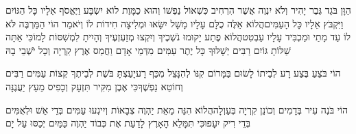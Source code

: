 \documentclass[../main/main.tex]{subfiles}
\begin{document}
\begin{multicols}{\ncols}
הַוָּן\SubEnd{} בֹּגֵד גֶּבֶר יָהִיר וְלֹא יִנְוֶה אֲשֶׁר הִרְחִיב כִּשְׁאוֹל נַפְשׁוֹ וְהוּא כַמָּוֶת לוֹא\SubEnd{} יִשְׂבָּע וַיֶּאֱסֹף אֵלָיו כָּל הַגּוֹיִם וַיִּקְבֹּץ אֵלָיו כָּל הָעַמִּים\PreVerseSpace{}הֲלוֹא אֵלֶּה כֻלָּם עָלָיו מָשָׁל יִשָּׂאוּ וּמְלִיצָה חִידוֹת לוֹ וְיֹאמַר הוֹי הַמַּרְבֶּה לֹּא לוֹ עַד מָתַי וּמַכְבִּיד עָלָיו עַבְטִט\PreVerseSpace{}הֲלוֹא פֶתַע יָקוּמוּ נֹשְׁכֶיךָ וְיִקְצוּ מְזַעְזְעֶיךָ וְהָיִיתָ לִמְשִׁסּוֹת לָמוֹ\PreVerseSpace{}כִּי אַתָּה שַׁלּוֹתָ גּוֹיִם רַבִּים יְשָׁלּוּךָ כָּל יֶתֶר עַמִּים מִדְּמֵי אָדָם וַחֲמַס אֶרֶץ קִרְיָה וְכָל יֹשְׁבֵי בָהּ\OpenSection{}\par
{}הוֹי בֹּצֵעַ בֶּצַע רָע לְבֵיתוֹ לָשׂוּם בַּמָּרוֹם קִנּוֹ לְהִנָּצֵל מִכַּף רָע\PreVerseSpace{}יָעַצְתָּ בֹּשֶׁת לְבֵיתֶךָ קְצוֹת עַמִּים רַבִּים וְחוֹטֵא נַפְשֶׁךָ\PreVerseSpace{}כִּי אֶבֶן מִקִּיר תִּזְעָק וְכָפִיס מֵעֵץ יַעֲנֶנָּה\OpenSection{}\par
{}הוֹי בֹּנֶה עִיר בְּדָמִים וְכוֹנֵן קִרְיָה בְּעַוְלָה\PreVerseSpace{}הֲלוֹא הִנֵּה מֵאֵת יַהְוֶה צְבָאוֹת וְיִיגְעוּ עַמִּים בְּדֵי אֵשׁ וּלְאֻמִּים בְּדֵי רִיק יִעָפוּ\PreVerseSpace{}כִּי תִּמָּלֵא הָאָרֶץ לָדַעַת אֶת כְּבוֹד יַהְוֶה כַּמַּיִם יְכַסּוּ עַל יָם\OpenSection{}\par

\end{multicols}
\end{document}

